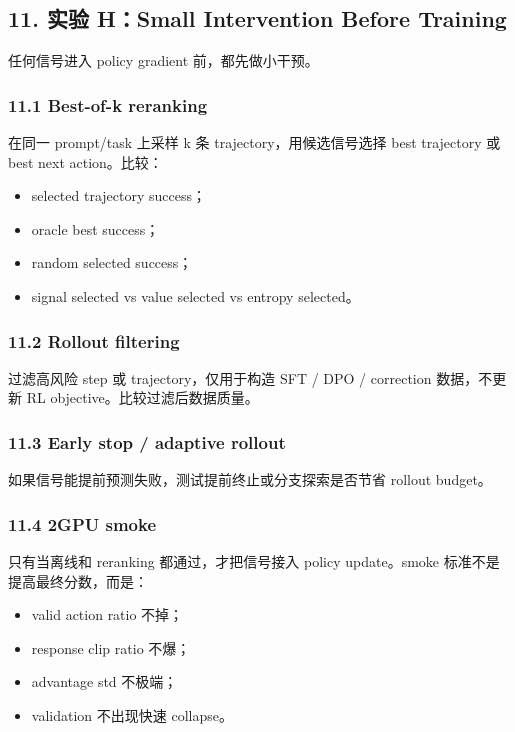 \documentclass[
  10pt,
]{ctexart}
\providecommand{\tightlist}{%
  \setlength{\itemsep}{0pt}\setlength{\parskip}{0pt}}
\begin{document}
\subsection{11. 实验 H：Small Intervention Before
Training}\label{ux5b9eux9a8c-hsmall-intervention-before-training}

任何信号进入 policy gradient 前，都先做小干预。

\subsubsection{11.1 Best-of-k reranking}\label{best-of-k-reranking}

在同一 prompt/task 上采样 k 条 trajectory，用候选信号选择 best
trajectory 或 best next action。比较：

\begin{itemize}
\tightlist
\item
  selected trajectory success；
\item
  oracle best success；
\item
  random selected success；
\item
  signal selected vs value selected vs entropy selected。
\end{itemize}

\subsubsection{11.2 Rollout filtering}\label{rollout-filtering}

过滤高风险 step 或 trajectory，仅用于构造 SFT / DPO / correction
数据，不更新 RL objective。比较过滤后数据质量。

\subsubsection{11.3 Early stop / adaptive
rollout}\label{early-stop-adaptive-rollout}

如果信号能提前预测失败，测试提前终止或分支探索是否节省 rollout budget。

\subsubsection{11.4 2GPU smoke}\label{gpu-smoke}

只有当离线和 reranking 都通过，才把信号接入 policy update。smoke
标准不是提高最终分数，而是：

\begin{itemize}
\tightlist
\item
  valid action ratio 不掉；
\item
  response clip ratio 不爆；
\item
  advantage std 不极端；
\item
  validation 不出现快速 collapse。
\end{itemize}
\end{document}
